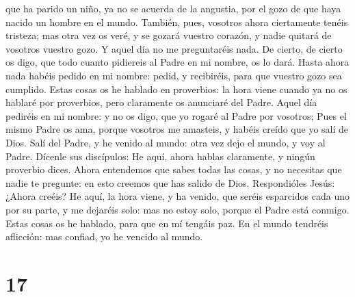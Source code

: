 que ha parido un niño, ya no se acuerda de la angustia, por el gozo de
que haya nacido un hombre en el mundo.  También, pues,
vosotros ahora ciertamente tenéis tristeza; mas otra vez os veré, y se
gozará vuestro corazón, y nadie quitará de vosotros vuestro gozo.
 Y aquel día no me preguntaréis nada. De cierto, de cierto
os digo, que todo cuanto pidiereis al Padre en mi nombre, os lo dará.
 Hasta ahora nada habéis pedido en mi nombre: pedid, y
recibiréis, para que vuestro gozo sea cumplido.  Estas
cosas os he hablado en proverbios: la hora viene cuando ya no os hablaré
por proverbios, pero claramente os anunciaré del Padre. 
Aquel día pediréis en mi nombre: y no os digo, que yo rogaré al Padre
por vosotros;  Pues el mismo Padre os ama, porque vosotros
me amasteis, y habéis creído que yo salí de Dios.  Salí del
Padre, y he venido al mundo: otra vez dejo el mundo, y voy al Padre.
 Dícenle sus discípulos: He aquí, ahora hablas claramente,
y ningún proverbio dices.  Ahora entendemos que sabes todas
las cosas, y no necesitas que nadie te pregunte: en esto creemos que has
salido de Dios.  Respondióles Jesús: ¿Ahora creéis?
 He aquí, la hora viene, y ha venido, que seréis esparcidos
cada uno por su parte, y me dejaréis solo: mas no estoy solo, porque el
Padre está conmigo.  Estas cosas os he hablado, para que en
mí tengáis paz. En el mundo tendréis aflicción: mas confiad, yo he
vencido al mundo.

\hypertarget{section-16}{%
\section{17}\label{section-16}}

